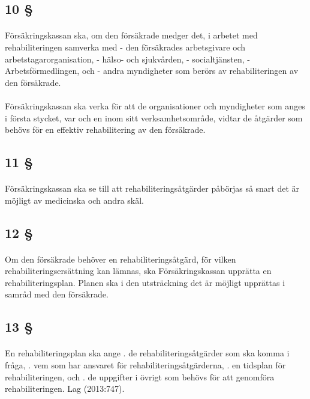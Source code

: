 \documentclass[a4paper,notitlepage,openany,10pt]{book}
\begin{document}
\subsection*{10 §}
\paragraph*{}
Försäkringskassan ska, om den försäkrade medger det, i arbetet med rehabiliteringen samverka med
\newline - den försäkrades arbetsgivare och arbetstagarorganisation,
\newline - hälso- och sjukvården,
\newline - socialtjänsten,
\newline - Arbetsförmedlingen, och
\newline - andra myndigheter som berörs av rehabiliteringen av den försäkrade.
\paragraph*{}
Försäkringskassan ska verka för att de organisationer och myndigheter som anges i första stycket, var och en inom sitt verksamhetsområde, vidtar de åtgärder som behövs för en effektiv rehabilitering av den försäkrade.
\subsection*{11 §}
\paragraph*{}
Försäkringskassan ska se till att rehabiliteringsåtgärder påbörjas så snart det är möjligt av medicinska och andra skäl.
\subsection*{12 §}
\paragraph*{}
Om den försäkrade behöver en rehabiliteringsåtgärd, för vilken rehabiliteringsersättning kan lämnas, ska Försäkringskassan upprätta en rehabiliteringsplan. Planen ska i den utsträckning det är möjligt upprättas i samråd med den försäkrade.
\subsection*{13 §}
\paragraph*{}
En rehabiliteringsplan ska ange
. de rehabiliteringsåtgärder som ska komma i fråga,
. vem som har ansvaret för rehabiliteringsåtgärderna,
. en tidsplan för rehabiliteringen, och
. de uppgifter i övrigt som behövs för att genomföra rehabiliteringen.
Lag (2013:747).
\end{document}
